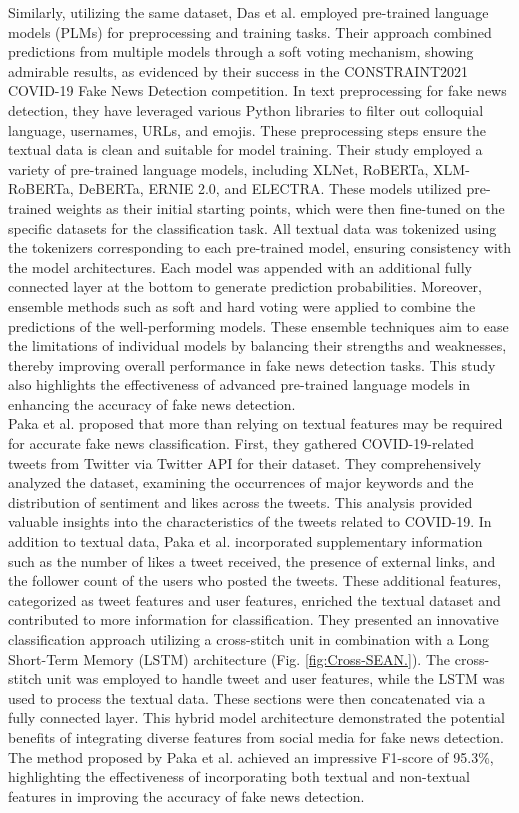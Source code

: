 Similarly, utilizing the same dataset, Das et al.\cite{b5} employed pre-trained language models (PLMs) for preprocessing and training tasks. Their approach combined predictions from multiple models through a soft voting mechanism, showing admirable results, as evidenced by their success in the CONSTRAINT2021 COVID-19 Fake News Detection competition.
In text preprocessing for fake news detection, they have leveraged various Python libraries to filter out colloquial language, usernames, URLs, and emojis. These preprocessing steps ensure the textual data is clean and suitable for model training.
Their study employed a variety of pre-trained language models, including XLNet, RoBERTa, XLM-RoBERTa, DeBERTa, ERNIE 2.0, and ELECTRA. These models utilized pre-trained weights as their initial starting points, which were then fine-tuned on the specific datasets for the classification task. All textual data was tokenized using the tokenizers corresponding to each pre-trained model, ensuring consistency with the model architectures.
Each model was appended with an additional fully connected layer at the bottom to generate prediction probabilities. Moreover, ensemble methods such as soft and hard voting were applied to combine the predictions of the well-performing models. These ensemble techniques aim to ease the limitations of individual models by balancing their strengths and weaknesses, thereby improving overall performance in fake news detection tasks. This study also highlights the effectiveness of advanced pre-trained language models in enhancing the accuracy of fake news detection.\\

Paka et al. \cite {b6} proposed that more than relying on textual features may be required for accurate fake news classification. 
First, they gathered COVID-19-related tweets from Twitter via Twitter API for their dataset. They comprehensively analyzed the dataset, examining the occurrences of major keywords and the distribution of sentiment and likes across the tweets. This analysis provided valuable insights into the characteristics of the tweets related to COVID-19. 
In addition to textual data, Paka et al. incorporated supplementary information such as the number of likes a tweet received, the presence of external links, and the follower count of the users who posted the tweets. These additional features, categorized as tweet features and user features, enriched the textual dataset and contributed to more information for classification.  
They presented an innovative classification approach utilizing a cross-stitch unit in combination with a Long Short-Term Memory (LSTM) architecture (Fig. \ref{fig:Cross-SEAN.}). The cross-stitch unit was employed to handle tweet and user features, while the LSTM was used to process the textual data. These sections were then concatenated via a fully connected layer. This hybrid model architecture demonstrated the potential benefits of integrating diverse features from social media for fake news detection.
The method proposed by Paka et al. achieved an impressive F1-score of 95.3\%, highlighting the effectiveness of incorporating both textual and non-textual features in improving the accuracy of fake news detection.\\

